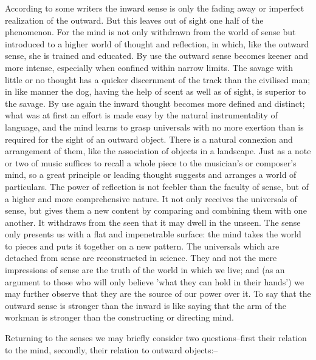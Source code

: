 According to some writers the inward sense is only the fading away or
imperfect realization of the outward. But this leaves out of sight one
half of the phenomenon. For the mind is not only withdrawn from
the world of sense but introduced to a higher world of thought and
reflection, in which, like the outward sense, she is trained and
educated. By use the outward sense becomes keener and more intense,
especially when confined within narrow limits. The savage with little
or no thought has a quicker discernment of the track than the civilised
man; in like manner the dog, having the help of scent as well as of
sight, is superior to the savage. By use again the inward thought
becomes more defined and distinct; what was at first an effort is made
easy by the natural instrumentality of language, and the mind learns to
grasp universals with no more exertion than is required for the sight of
an outward object. There is a natural connexion and arrangement of them,
like the association of objects in a landscape. Just as a note or two of
music suffices to recall a whole piece to the musician's or composer's
mind, so a great principle or leading thought suggests and arranges a
world of particulars. The power of reflection is not feebler than the
faculty of sense, but of a higher and more comprehensive nature. It not
only receives the universals of sense, but gives them a new content by
comparing and combining them with one another. It withdraws from the
seen that it may dwell in the unseen. The sense only presents us with
a flat and impenetrable surface: the mind takes the world to pieces and
puts it together on a new pattern. The universals which are detached
from sense are reconstructed in science. They and not the mere
impressions of sense are the truth of the world in which we live; and
(as an argument to those who will only believe 'what they can hold in
their hands') we may further observe that they are the source of our
power over it. To say that the outward sense is stronger than the
inward is like saying that the arm of the workman is stronger than the
constructing or directing mind.

Returning to the senses we may briefly consider two questions--first
their relation to the mind, secondly, their relation to outward
objects:--

